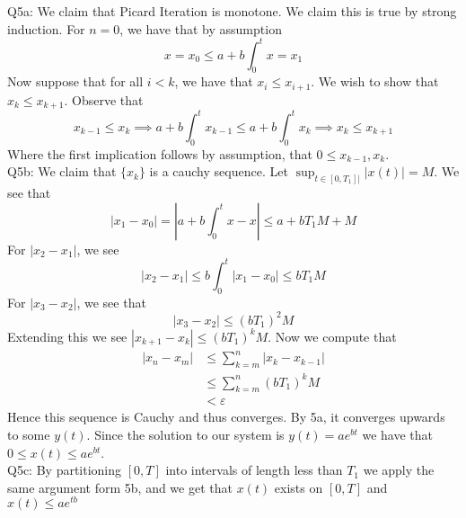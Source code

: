 \documentclass[letterpaper]{article}
\begin{document}
\noindent Q5a: We claim that Picard Iteration is monotone. We claim this is true by strong induction. For $n=0$, we have that by assumption $$x=x_0 \leq a+ b\int_0^t x = x_1$$
Now suppose that for all $i< k$, we have that $x_i \leq x_{i+1}$. We wish to show that $x_k\leq x_{k+1}$. Observe that 
$$x_{k-1} \leq x_k \implies a+b \int_{0}^t  x_{k-1} \leq a + b\int_0^t x_k \implies x_k \leq x_{k+1}$$ Where the first implication follows by assumption, that $0\leq x_{k-1},x_{k}$.
\newline \\ Q5b: We claim that $\{x_k\}$  is a cauchy sequence. Let $\sup_{t\in[0,T_1]|}|x(t)| = M$. We see that $$|x_1-x_0| = |a+b \int_{0}^t x -x | \leq a+ bT_1 M +M $$
For $|x_2-x_1|$,  we see $$|x_2-x_1| \leq b\int_{0}^t |x_1-x_0| \leq bT_1 M$$
For $|x_3-x_2|$, we see that $$|x_3-x_2| \leq (bT_1)^2M$$ 
Extending this we see $|x_{k+1}-x_k| \leq (bT_1)^kM$. Now we compute that 
\begin{align*}
    |x_n-x_m| & \leq \sum_{k=m}^n |x_k-x_{k-1}|
    \\ & \leq \sum_{k=m}^n (bT_1)^kM
    \\ & < \varepsilon \tag{since $bT_1<1$ can be made sufficiently small}
\end{align*} Hence this sequence is Cauchy and thus converges. By 5a, it converges upwards to some $y(t)$. Since the solution to our system is $y(t)= ae^{bt}$ we have that $0\leq x(t) \leq ae^{bt}$.
\newline \\ Q5c: By partitioning $[0,T]$ into intervals of length less than $T_1$ we apply the same argument form 5b, and we get that $x(t)$ exists on $[0,T]$ and $x(t)\leq ae^{tb}$
\end{document}
